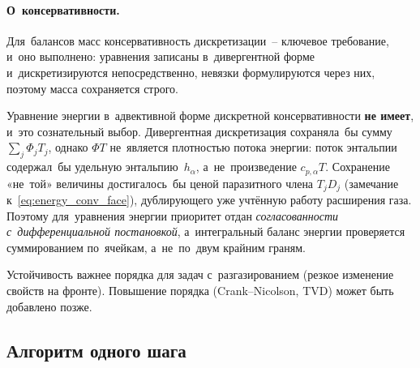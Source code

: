 \documentclass[12pt,a4paper]{article}
\begin{document}
\paragraph{О~консервативности.}
Для~балансов масс консервативность дискретизации~-- ключевое
требование, и~оно выполнено: уравнения записаны в~дивергентной форме
и~дискретизируются непосредственно, невязки формулируются через них,
поэтому масса сохраняется строго.

Уравнение энергии в~адвективной форме дискретной консервативности
\textbf{не имеет}, и~это сознательный выбор. Дивергентная
дискретизация сохраняла~бы сумму $\sum_j \Phi_j T_j$, однако $\Phi T$
не~является плотностью потока энергии: поток энтальпии содержал~бы
удельную энтальпию~$h_\alpha$, а~не~произведение $c_{p,\alpha}T$.
Сохранение «не~той» величины достигалось~бы ценой паразитного члена
$T_j D_j$ (замечание к~\eqref{eq:energy_conv_face}), дублирующего
уже учтённую работу расширения газа. Поэтому для~уравнения энергии
приоритет отдан \emph{согласованности с~дифференциальной постановкой},
а~интегральный баланс энергии проверяется суммированием по~ячейкам,
а~не~по~двум крайним граням.

Устойчивость важнее порядка для задач
с~разгазированием (резкое изменение свойств на фронте). Повышение
порядка (Crank--Nicolson, TVD) может быть добавлено позже.


\subsection{Алгоритм одного шага}\label{ssec:algorithm}
\end{document}
